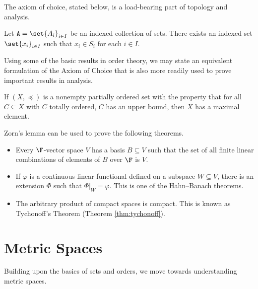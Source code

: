 The axiom of choice, stated below, is a load-bearing part of topology and analysis.
\begin{definition}
  Let $\mathcal{A} = \set{A_i}_{i\in I}$ be an indexed collection of sets. There exists an indexed set $\set{x_i}_{i\in I}$ such that $x_i\in S_i$ for each $i\in I$.
\end{definition}
Using some of the basic results in order theory, we may state an equivalent formulation of the Axiom of Choice that is also more readily used to prove important results in analysis.
\begin{theorem}
  If $\left(X,\preceq\right)$ is a nonempty partially ordered set with the property that for all $C\subseteq X$ with $C$ totally ordered, $C$ has an upper bound, then $X$ has a maximal element.
\end{theorem}
Zorn's lemma can be used to prove the following theorems.
\begin{example}\hfill
  \begin{itemize}
    \item Every $\F$-vector space $V$ has a basis $B\subseteq V$ such that the set of all finite linear combinations of elements of $B$ over $\F$ is $V$.
    \item If $\varphi$ is a continuous linear functional defined on a subspace $W\subseteq V$, there is an extension $\Phi$ such that $\Phi|_{W} = \varphi$. This is one of the Hahn--Banach theorems. %
    \item The arbitrary product of compact spaces is compact. This is known as Tychonoff's Theorem (Theorem \ref{thm:tychonoff}). %
  \end{itemize}
\end{example}
\section{Metric Spaces}%
Building upon the basics of sets and orders, we move towards understanding metric spaces.

